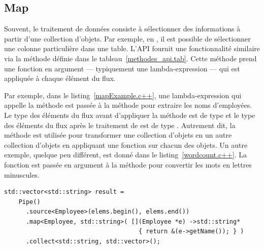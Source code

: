 \subsection{Map}





Souvent, le traitement de donn\'ees consiste \`a s\'electionner des informations \`a partir d'une collection d'objets. Par exemple, en , il est possible de s\'electionner une colonne particuli\`ere dans une table. L'API fournit une fonctionnalit\'e similaire via la m\'ethode  d\'efinie dans le tableau~\ref{methodes_api.tab}. Cette m\'ethode prend une fonction en argument --- typiquement une lambda-expression --- qui est appliqu\'ee \`a chaque \'el\'ement du flux. 


Par exemple, dans le listing~\ref{mapExample.c++}, une lambda-expression qui appelle la m\'ethode  est pass\'ee \`a la m\'ethode  pour extraire  les noms d'employ\'ees. Le type des \'el\'ements du flux avant d'appliquer la m\'ethode  est de type  et le type des \'el\'ements du flux apr\`es le traitement de  est de type . Autrement dit, la m\'ethode  est utilis\'ee pour transformer une collection d'objets en un autre collection d'objets en appliquant une fonction sur chacun des objets. Un autre exemple, quelque peu diff\'erent, est donn\'e dans le listing~\ref{wordcount.c++}. La fonction  est pass\'ee en argument \`a la m\'ethode  pour convertir les mots en lettres minuscules. 

\begin{Listing}[tbp]
\begin{lstlisting}
std::vector<std::string> result =
    Pipe()
      .source<Employee>(elems.begin(), elems.end())
      .map<Employee, std::string>( [](Employee *e) ->std::string* 
                                     { return &(e->getName()); } )
      .collect<std::string, std::vector>();
\end{lstlisting}
\caption{Transformation d'une propri\'et\'e d'un objet \`a l'aide de .}
\label{mapExample.c++}
\end{Listing}


